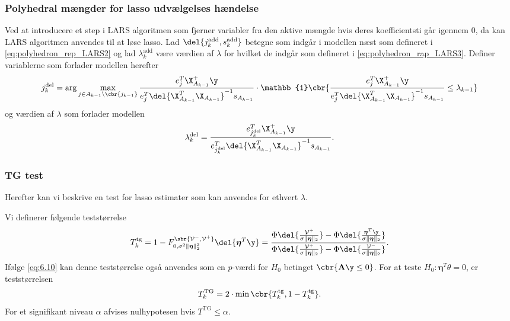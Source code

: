 \subsubsection{Polyhedral mængder for lasso udvælgelses hændelse}
Ved at introducere et step i LARS algoritmen som fjerner variabler fra den aktive mængde hvis deres koefficientsti  går igennem 0, da kan LARS algoritmen anvendes til at løse lasso.
Lad \(\del{j_k^\text{add}, s_k^\text{add}}\) betegne som indgår i modellen næst som defineret i \eqref{eq:polyhedron_rep_LARS2} og lad \(\lambda_k^\text{add}\) være værdien af \(\lambda\) for hvilket de indgår som defineret i \eqref{eq:polyhedron_rap_LARS3}.
Definer variablerne som forlader modellen herefter
\begin{align*}
j_k^\text{del} = \arg \max_{j \in A_{k-1} \backslash \cbr{j_{k-1}}} \frac{e_j^T \X_{A_{k-1}}^+ \y}{e_j^T \del{\X_{A_{k-1}}^T \X_{A_{k-1}}}^{-1} s_{A_{k-1}}} \cdot \mathbb{1} \cbr{\frac{e_j^T \X_{A_{k-1}}^+ \y}{e_j^T \del{\X_{A_{k-1}}^T \X_{A_{k-1}}}^{-1} s_{A_{k-1}}} \leq \lambda_{k-1}}
\end{align*}
og værdien af \(\lambda\) som forlader modellen
\begin{align*}
\lambda_k^\text{del} = \frac{e_{j_k^\text{del}}^T \X_{A_{k-1}}^+ \y}{e_{j_k^\text{del}}^T \del{\X_{A_{k-1}}^T \X_{A_{k-1}}}^{-1} s_{A_{k-1}}}.
\end{align*}



\subsubsection{TG test}
Herefter kan vi beskrive en test for lasso estimater som kan anvendes for ethvert \(\lambda\).

Vi definerer følgende teststørrelse
\begin{align*}
T_k^\text{tg}=1- F_{0, \sigma^2 \Vert \boldsymbol{\eta} \Vert_2^2}^{\sbr{\mathcal{V}^-, \mathcal{V}^+}} \del{\boldsymbol{\eta}^T \y} = \frac{\Phi \del{\frac{\mathcal{V}^+}{\sigma \Vert \boldsymbol{\eta} \Vert_2}}-\Phi \del{\frac{\boldsymbol{\eta}^T \y}{\sigma  \Vert \boldsymbol{\eta} \Vert_2}}}{\Phi \del{\frac{\mathcal{V}^+}{\sigma  \Vert \boldsymbol{\eta} \Vert_2}}-\Phi \del{\frac{\mathcal{V}^-}{\sigma \Vert \boldsymbol{\eta} \Vert_2}}}.
\end{align*}
Ifølge \eqref{eq:6.10} kan denne teststørrelse også anvendes som en \(p\)-værdi for \(H_0\) betinget \(\cbr{\mathbf{A} \y \leq 0}\).
For at teste \(H_0: \boldsymbol{\eta}^T \theta=0\), er teststørrelsen
\begin{align*}
T_k^\text{TG}= 2 \cdot \min \cbr{T_k^{\text{tg}}, 1-T_k^{\text{tg}}}.
\end{align*}
For et signifikant niveau $\alpha$ afvises nulhypotesen hvis \(T^{\text{TG}} \leq \alpha\).

